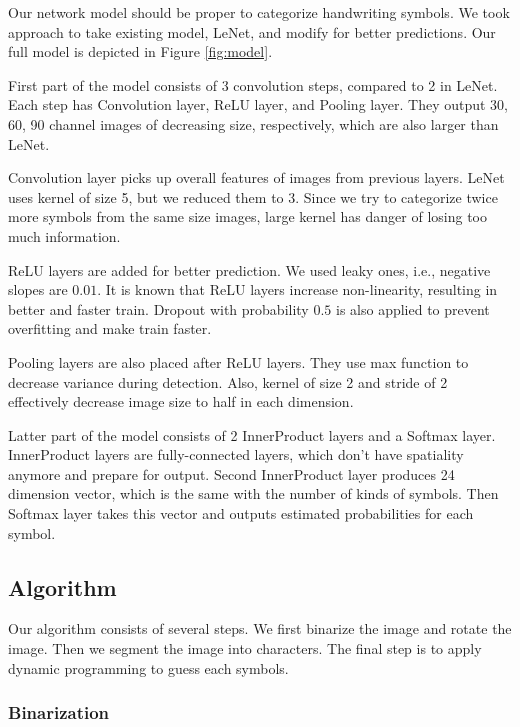 \documentclass[10pt,twocolumn,letterpaper]{article}
\begin{document}
Our network model should be proper to categorize handwriting symbols.
We took approach to take existing model, LeNet, and modify for better predictions.
Our full model is depicted in Figure \ref{fig:model}.

First part of the model consists of 3 convolution steps, compared to 2 in LeNet.
Each step has Convolution layer, ReLU layer, and Pooling layer.
They output 30, 60, 90 channel images of decreasing size, respectively, which are also larger than LeNet.

Convolution layer picks up overall features of images from previous layers.
LeNet uses kernel of size 5, but we reduced them to 3.
Since we try to categorize twice more symbols from the same size images, large kernel has danger of losing too much information. 

ReLU layers are added for better prediction.
We used leaky ones, i.e., negative slopes are $0.01$.
It is known that ReLU layers increase non-linearity, resulting in better and faster train.
Dropout with probability $0.5$ is also applied to prevent overfitting and make train faster.

Pooling layers are also placed after ReLU layers.
They use max function to decrease variance during detection.
Also, kernel of size 2 and stride of 2 effectively decrease image size to half in each dimension.

Latter part of the model consists of 2 InnerProduct layers and a Softmax layer.
InnerProduct layers are fully-connected layers, which don't have spatiality anymore and prepare for output.
Second InnerProduct layer produces 24 dimension vector, which is the same with the number of kinds of symbols.
Then Softmax layer takes this vector and outputs estimated probabilities for each symbol.

\subsection{Algorithm}

Our algorithm consists of several steps. We first binarize the image and rotate the image.
Then we segment the image into characters.
The final step is to apply dynamic programming to guess each symbols.

\subsubsection{Binarization}
\end{document}
